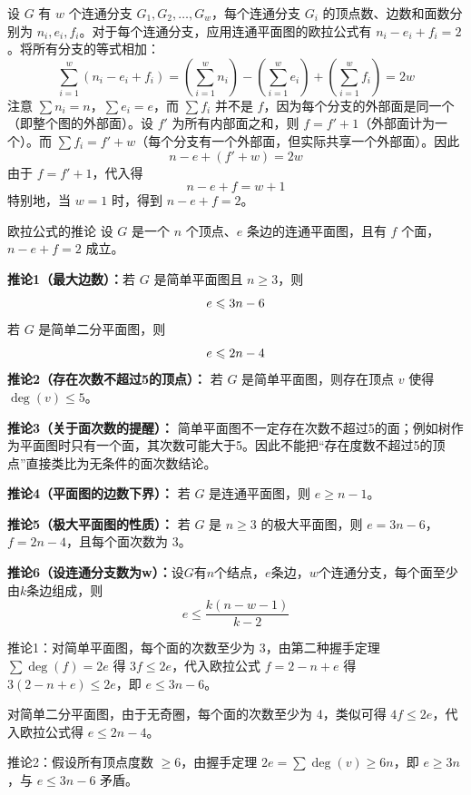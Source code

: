 设 $G$ 有 $w$ 个连通分支 $G_1, G_2, \dots, G_w$，每个连通分支 $G_i$ 的顶点数、边数和面数分别为 $n_i, e_i, f_i$。对于每个连通分支，应用连通平面图的欧拉公式有 $n_i - e_i + f_i = 2$。将所有分支的等式相加：
\[
\sum_{i=1}^w (n_i - e_i + f_i) =\left(\sum_{i=1}^w n_i\right) - \left(\sum_{i=1}^w e_i\right) + \left(\sum_{i=1}^w f_i\right) = 2w
\]
注意 $\sum n_i = n$，$\sum e_i = e$，而 $\sum f_i$ 并不是 $f$，因为每个分支的外部面是同一个（即整个图的外部面）。设 $f'$ 为所有内部面之和，则 $f = f' + 1$（外部面计为一个）。而 $\sum f_i = f' + w$（每个分支有一个外部面，但实际共享一个外部面）。因此
\[
n - e + (f' + w) = 2w
\]
由于 $f = f' + 1$，代入得
\[
n - e + f = w + 1
\]
特别地，当 $w=1$ 时，得到 $n - e + f = 2$。
\begin{theorem}{欧拉公式的推论}{}
    设 $G$ 是一个 $n$ 个顶点、$e$ 条边的连通平面图，且有 $f$ 个面，$n-e+f=2$ 成立。

\textbf{推论1（最大边数）：}若 $G$ 是简单平面图且 $n \geqslant 3$，则\vspace{-10pt}
\[
e \leqslant 3n - 6\vspace{-10pt}
\]
若 $G$ 是简单二分平面图，则\vspace{-10pt}
\[
e \leqslant 2n - 4\vspace{-10pt}
\]
\textbf{推论2（存在次数不超过5的顶点）：}
若 $G$ 是简单平面图，则存在顶点 $v$ 使得 $\deg(v) \leqslant 5$。

\textbf{推论3（关于面次数的提醒）：}
简单平面图不一定存在次数不超过5的面；例如树作为平面图时只有一个面，其次数可能大于5。因此不能把“存在度数不超过5的顶点”直接类比为无条件的面次数结论。

\textbf{推论4（平面图的边数下界）：}
若 $G$ 是连通平面图，则 $e \geqslant n-1$。

\textbf{推论5（极大平面图的性质）：}
若 $G$ 是 $n \geqslant 3$ 的极大平面图，则 $e = 3n-6$，$f = 2n-4$，且每个面次数为 3。

\textbf{推论6（设连通分支数为w）：}设$G$有$n$个结点，$e$条边，$w$个连通分支，每个面至少由$k$条边组成，则\vspace{-10pt}\[e\leqslant \dfrac{k(n-w-1)}{k-2}\]
\end{theorem}
推论1：对简单平面图，每个面的次数至少为 3，由第二种握手定理 $\sum \deg(f) = 2e$ 得 $3f \leqslant 2e$，代入欧拉公式 $f = 2 - n + e$ 得 $3(2-n+e) \leqslant 2e$，即 $e \leqslant 3n-6$。

对简单二分平面图，由于无奇圈，每个面的次数至少为 4，类似可得 $4f \leqslant 2e$，代入欧拉公式得 $e \leqslant 2n-4$。

推论2：假设所有顶点度数 $\geqslant 6$，由握手定理 $2e = \sum \deg(v) \geqslant 6n$，即 $e \geqslant 3n$，与 $e \leqslant 3n-6$ 矛盾。

